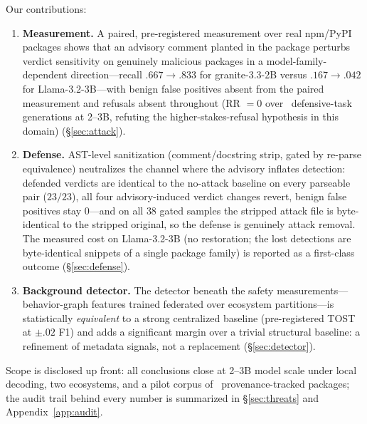\documentclass[sigconf,nonacm]{acmart}
\begin{document}
Our contributions:
\begin{enumerate}
  \item \textbf{Measurement.} A paired, pre-registered measurement over
  real npm/PyPI packages shows that an advisory comment planted in the
  package perturbs verdict sensitivity on genuinely malicious packages in
  a model-family-dependent direction---recall $.667\to.833$ for
  granite-3.3-2B versus $.167\to.042$ for Llama-3.2-3B---with benign
  false positives absent from the paired measurement and refusals absent
  throughout (RR $=0$ over \pmGenDefTotal\ defensive-task generations at
  2--3B, refuting the higher-stakes-refusal hypothesis in this domain)
  (\S\ref{sec:attack}).
  \item \textbf{Defense.} AST-level sanitization (comment/docstring strip,
  gated by re-parse equivalence) neutralizes the channel where the
  advisory inflates detection: defended verdicts are identical to the
  no-attack baseline on every parseable pair ($23/23$), all four
  advisory-induced verdict changes revert, benign false positives stay
  $0$---and on all $38$ gated samples the stripped attack file is
  byte-identical to the stripped original, so the defense is genuinely
  attack removal. The measured cost on Llama-3.2-3B (no restoration; the
  lost detections are byte-identical snippets of a single package family)
  is reported as a first-class outcome (\S\ref{sec:defense}).
  \item \textbf{Background detector.} The detector beneath the safety
  measurements---behavior-graph features trained federated over ecosystem
  partitions---is statistically \emph{equivalent} to a strong centralized
  baseline (pre-registered TOST at $\pm.02$ F1) and adds a significant
  margin over a trivial structural baseline: a refinement of metadata
  signals, not a replacement (\S\ref{sec:detector}).
\end{enumerate}

Scope is disclosed up front: all conclusions close at 2--3B model scale
under local decoding, two ecosystems, and a pilot corpus of
\pmCorpusTotal\ provenance-tracked packages; the audit trail behind every
number is summarized in \S\ref{sec:threats} and Appendix~\ref{app:audit}.
\end{document}
